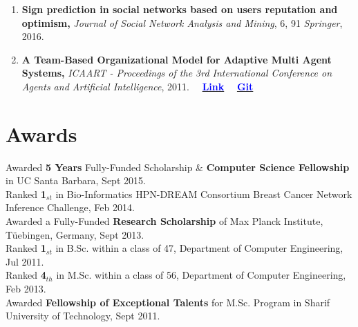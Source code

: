 \documentclass[letter]{res}
\begin{document}
\begin{resume}
\begin{enumerate}[leftmargin=-.01in]
			\item \textbf{Sign prediction in social networks based on users reputation and optimism,} \textit{Journal of Social Network Analysis and Mining}, 6, 91 \textit{Springer}, 2016.
			
			
			\item \textbf{A Team-Based Organizational Model for Adaptive Multi Agent Systems,} \textit{ICAART - Proceedings of the 3rd International Conference on Agents and Artificial Intelligence}, 2011.
			~~\href{https://www.researchgate.net/publication/221539731_A_Team-based_Organizational_Model_for_Adaptive_Multi-agent_Systems}{\textbf{\textcolor{blue}{Link}}}
			~~\href{https://github.com/omid55/team_based_rescue_jade_multi_agent_system}{\textbf{\textcolor{blue}{Git}}}
			
		\end{enumerate}
		
		
		\section{Awards}
		Awarded \textbf{5 Years} Fully-Funded Scholarship \& \textbf{Computer Science Fellowship} in UC Santa Barbara, Sept 2015.\\
		Ranked \textbf{1}$_{st}$ in Bio-Informatics HPN-DREAM Consortium Breast Cancer Network Inference Challenge, Feb 2014.\\
		Awarded a Fully-Funded \textbf{Research Scholarship} of Max Planck Institute, Tüebingen, Germany, Sept 2013.\\
		Ranked \textbf{1}$_{st}$ in B.Sc. within a class of 47, Department of Computer Engineering, Jul 2011.\\
		Ranked \textbf{4}$_{th}$ in M.Sc. within a class of 56, Department of Computer Engineering, Feb 2013.\\
		Awarded \textbf{Fellowship of Exceptional Talents} for M.Sc. Program in Sharif University of Technology, Sept 2011.
		

\end{resume}
\end{document}
